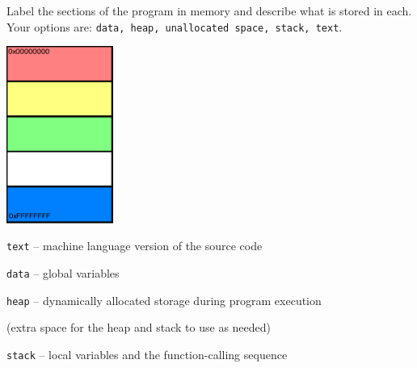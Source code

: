 Label the sections of the program in memory and describe what is stored in each. Your options are: \texttt{data, heap, unallocated space, stack, text}.

\begin{minipage}{0.2\textwidth}
	\includegraphics[width=35mm]{other/programstructure.png}
\end{minipage}
\begin{minipage}{0.7\textwidth}
	\begin{answer}

	\texttt{text} -- machine language version of the source code

	\bigskip \medskip

	\texttt{data} -- global variables

	\bigskip \medskip

	\texttt{heap} -- dynamically allocated storage during program execution

	\bigskip \medskip

	(extra space for the heap and stack to use as needed)

	\bigskip \medskip

	\texttt{stack} -- local variables and the function-calling sequence

	\end{answer}
\end{minipage} \hfill




